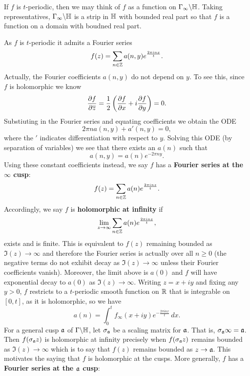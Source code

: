       \begin{remark}
        If $f$ is $t$-periodic, then we may think of $f$ as a function on $\Gamma_{\infty}\backslash\mathbb{H}$. Taking representatives, $\Gamma_{\infty}\backslash\mathbb{H}$ is a strip in $\mathbb{H}$ with bounded real part so that $f$ is a function on a domain with boudned real part.
      \end{remark}

      As $f$ is $t$-periodic it admits a Fourier series
      \[
        f(z) = \sum_{n \in \mathbb{Z}}a(n,y)e^{\frac{2\pi inx}{t}}.
      \]
      Actually, the Fourier coefficients $a(n,y)$ do not depend on $y$. To see this, since $f$ is holomorphic we know
      \[
        \frac{\partial f}{\partial\overline{z}} = \frac{1}{2}\left(\frac{\partial f}{\partial x}+i\frac{\partial f}{\partial y}\right) = 0.
      \]
      Substiuting in the Fourier series and equating coefficients we obtain the ODE
      \[
        2\pi na(n,y)+a'(n,y) = 0,
      \]
      where the $'$ indicates differentiation with respect to $y$. Solving this ODE (by separation of variables) we see that there exists an $a(n)$ such that
      \[
        a(n,y) = a(n)e^{-2\pi ny}.
      \]
      Using these constant coefficients instead, we say $f$ has a \textbf{Fourier series at the $\infty$ cusp}:
      \[
        f(z) = \sum_{n \in \mathbb{Z}}a(n)e^{\frac{2\pi inz}{t}}.
      \]
      Accordingly, we say $f$ is \textbf{holomorphic at infinity} if
      \[
        \lim_{z \to \infty}\sum_{n \in \mathbb{Z}}a(n)e^{\frac{2\pi inz}{t}},
      \]
      exists and is finite. This is equivalent to $f(z)$ remaining bounded as $\Im(z) \to \infty$ and therefore the Fourier series is actually over all $n \ge 0$ (the negative terms do not exhibit decay as $\Im(z) \to \infty$ unless their Fourier coefficients vanish). Moreover, the limit above is $a(0)$ and $f$ will have exponential decay to $a(0)$ as $\Im(z) \to \infty$. Writing $z = x+iy$ and fixing any $y > 0$, $f$ restricts to a $t$-periodic smooth function on $\mathbb{R}$ that is integrable on $[0,t]$, as it is holomorphic, so we have
      \[
        a(n) = \int_{0}^{t}f_{\infty}(x+iy)e^{-\frac{2\pi inx}{t}}\,dx.
      \]
      For a general cusp $\mathfrak{a}$ of $\Gamma\backslash\mathbb{H}$, let $\sigma_{\mathfrak{a}}$ be a scaling matrix for $\mathfrak{a}$. That is, $\sigma_{\mathfrak{a}}\infty = \mathfrak{a}$. Then $f(\sigma_{\mathfrak{a}}z)$ is holomorphic at infinity precisely when $f(\sigma_{\mathfrak{a}}z)$ remains bounded as $\Im(z) \to \infty$ which is to say that $f(z)$ remains bounded as $z \to \mathfrak{a}$. This motivates the saying that $f$ is holomorphic at the cusps. More generally, $f$ has a \textbf{Fourier series at the $\mathfrak{a}$ cusp}:
